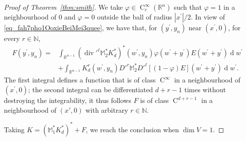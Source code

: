 \documentclass[a4paper,10pt]{amsart}
\newcommand{\R}{\mathbb R}
\newcommand{\N}{\mathbb N}
\newcommand{\dif}{\mathrm{d}}
\renewcommand{\dif}{\operatorname{d}\!}
\newcommand{\hold}{\operatorname{C}}
\numberwithin{equation}{section}
\theoremstyle{remark}
\numberwithin{equation}{section}
\begin{document}
\begin{proof}[Proof of Theorem~\ref{thm:smith}]
		We take $\varphi\in\hold^\infty_c(\R^n)$ such that $\varphi=1$ in a neighbourhood of $0$ and $\varphi=0$ outside the ball of radius $|x^\prime|/2$. In view of \eqref{eq_fah7pho1OoxieBeiMei3quee}, we have that, for $(y^\prime,y_n)$ near $(x^\prime,0)$, for every \(r \in \N\), 
		\begin{equation}
			\label{eq_ohkaZae2aaxosie4ahph1eiV}
			\begin{split}
				F (y^\prime,y_n)=&\int_{\R^{n-1}}(\operatorname{div}'^\ell \mathbb{M}_2^* K_d^*)^*(w^\prime,y_n)\varphi (w^\prime+y^\prime)E(w^\prime+y^\prime)\dif w^\prime\\
				&+\int_{\R^{n-1}}  K_d^r (w^\prime,y_n) D'^r \mathbb{M}_2^* D'^\ell \left[(1-\varphi)E\right](w^\prime+y^\prime)\dif w^\prime.
			\end{split}		
		\end{equation} 
		The first integral defines a function that is of class $\hold^\infty$ in a neighbourhood of $(x^\prime,0)$; the second integral can be differentiated \(d + r - 1\) times without destroying the integrability, it thus follows \(F\) is of class \(\hold^{d + r - 1}\) in a neighbourhood of \((x', 0)\) with arbitrary \(r \in \N\).
		
		Taking \(K = (\mathbb{M}_1^* K_d^*)^*  + F\), we reach the conclusion when \(\dim V = 1\).
		
		\medbreak
		

\end{proof}
\end{document}
